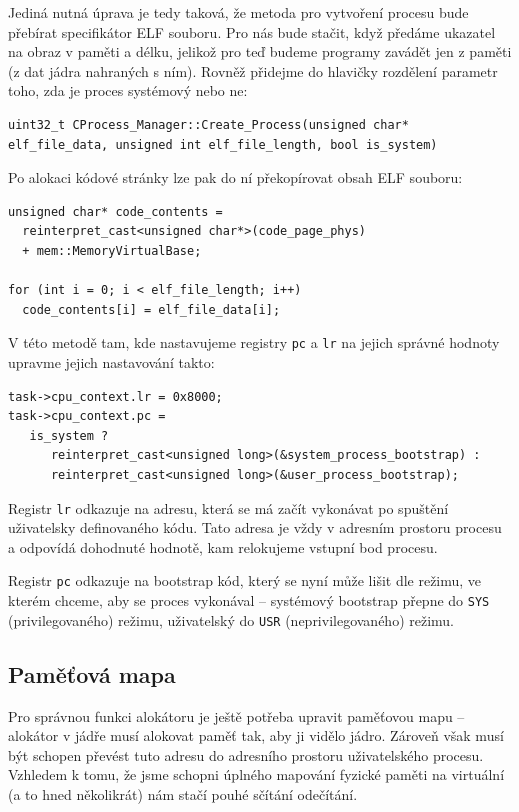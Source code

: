 \documentclass{article}
\begin{document}
Jediná nutná úprava je tedy taková, že metoda pro vytvoření procesu bude přebírat specifikátor ELF souboru. Pro nás bude stačit, když předáme ukazatel na obraz v paměti a délku, jelikož pro teď budeme programy zavádět jen z paměti (z dat jádra nahraných s ním). Rovněž přidejme do hlavičky rozdělení parametr toho, zda je proces systémový nebo ne:
\begin{lstlisting}
uint32_t CProcess_Manager::Create_Process(unsigned char* elf_file_data, unsigned int elf_file_length, bool is_system)
\end{lstlisting}
Po alokaci kódové stránky lze pak do ní překopírovat obsah ELF souboru:
\begin{lstlisting}
unsigned char* code_contents =
  reinterpret_cast<unsigned char*>(code_page_phys)
  + mem::MemoryVirtualBase;

for (int i = 0; i < elf_file_length; i++)
  code_contents[i] = elf_file_data[i];
\end{lstlisting}

V této metodě tam, kde nastavujeme registry {\tt pc} a {\tt lr} na jejich správné hodnoty upravme jejich nastavování takto:
\begin{lstlisting}
task->cpu_context.lr = 0x8000;
task->cpu_context.pc =
   is_system ?
      reinterpret_cast<unsigned long>(&system_process_bootstrap) :
      reinterpret_cast<unsigned long>(&user_process_bootstrap);
\end{lstlisting}
Registr {\tt lr} odkazuje na adresu, která se má začít vykonávat po spuštění uživatelsky definovaného kódu. Tato adresa je vždy v adresním prostoru procesu a odpovídá dohodnuté hodnotě, kam relokujeme vstupní bod procesu.

Registr {\tt pc} odkazuje na bootstrap kód, který se nyní může lišit dle režimu, ve kterém chceme, aby se proces vykonával -- systémový bootstrap přepne do {\tt SYS} (privilegovaného) režimu, uživatelský do {\tt USR} (neprivilegovaného) režimu.

\subsection{Paměťová mapa}

Pro správnou funkci alokátoru je ještě potřeba upravit paměťovou mapu -- alokátor v jádře musí alokovat paměť tak, aby ji vidělo jádro. Zároveň však musí být schopen převést tuto adresu do adresního prostoru uživatelského procesu. Vzhledem k tomu, že jsme schopni úplného mapování fyzické paměti na virtuální (a to hned několikrát) nám stačí pouhé sčítání odečítání.
\end{document}
